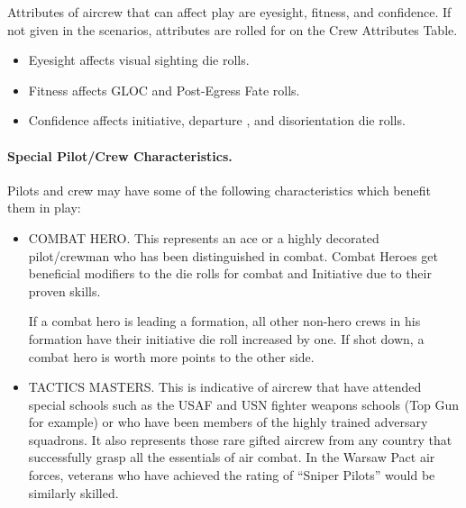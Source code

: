 \begin{advancedrules}
Attributes of aircrew that can affect play are eyesight, fitness, and confidence. If not given in the scenarios, attributes are rolled for on the Crew Attributes Table.

\begin{itemize}
    \item Eyesight affects visual sighting die rolls.
    \item Fitness affects GLOC and Post-Egress Fate rolls.
    \item Confidence affects initiative, departure , and disorientation die rolls.
\end{itemize}

\paragraph{Special Pilot/Crew Characteristics.} Pilots and crew may have some of the following characteristics which benefit them in play:

\begin{itemize}

    \item COMBAT HERO. This represents an ace or a highly decorated pilot/crewman who has been distinguished in combat. Combat Heroes get beneficial modifiers to the die rolls for combat and Initiative due to their proven skills.

    If a combat hero is leading a formation, all other non-hero crews in his formation have their initiative die roll increased by one.  If shot down, a combat hero is worth more points to the other side. 

    \item TACTICS MASTERS. This is indicative of aircrew that have attended special schools such as the USAF and USN fighter weapons schools (Top Gun for example) or who have been members of the highly trained adversary squadrons. It also represents those rare gifted aircrew from any country that successfully grasp all the essentials of air combat. In the Warsaw Pact air forces, veterans who have achieved the rating of “Sniper Pilots” would be similarly skilled.
    

\end{itemize}
\end{advancedrules}
